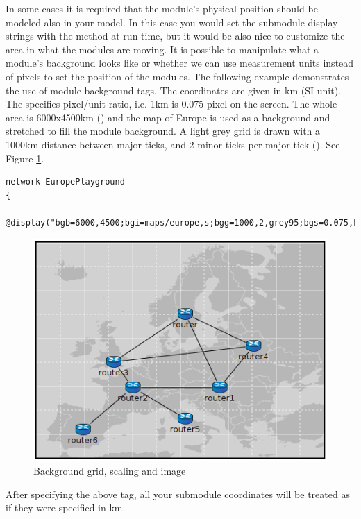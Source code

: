 In some cases it is required that the module's physical position should be modeled
also in your model. In this case you would set the submodule display strings with
the  method at run time, but it would be also nice to
customize the area in what the modules are moving. It is possible to manipulate
what a module's background looks like or whether we can use measurement units instead
of pixels to set the position of the modules. The following example demonstrates the use
of module background tags. The coordinates are given in km (SI unit).
The  specifies pixel/unit ratio, i.e. 1km is 0.075 pixel on the screen.
The whole area is 6000x4500km () and the map of Europe is used as a
background and stretched to fill the module background.
A light grey grid is drawn with a 1000km distance between major ticks, 
and 2 minor ticks per major tick (). 
See Figure \ref{fig:graphics-bgtags}.

\begin{verbatim}
network EuropePlayground
{
    @display("bgb=6000,4500;bgi=maps/europe,s;bgg=1000,2,grey95;bgs=0.075,km");
\end{verbatim}

\begin{figure}[htbp]
  \begin{center}
    \includegraphics{figures/graphics-bgtags}
    \caption{Background grid, scaling and image}
    \label{fig:graphics-bgtags}
  \end{center}
\end{figure}

After specifying the above  tag, all your submodule coordinates will be treated as if
they were specified in km.

